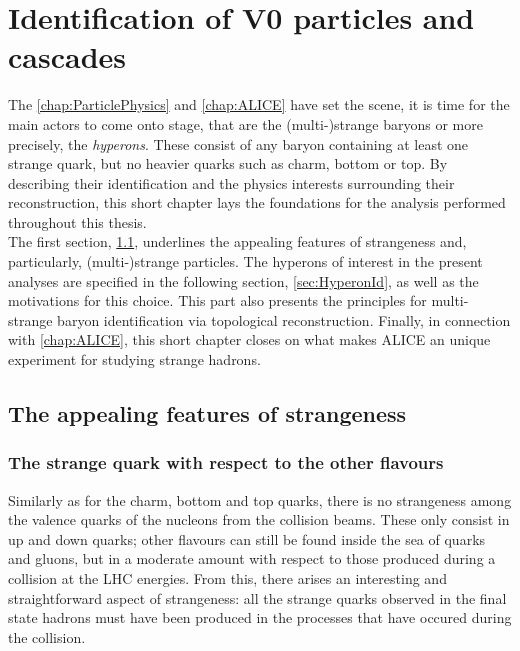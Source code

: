 \newpage
\chapter{Identification of V0 particles and cascades}
\label{chap:V0CascReconstruction}

The \chap\ref{chap:ParticlePhysics} and \ref{chap:ALICE} have set the scene, it is time for the main actors to come onto stage, that are the (multi-)strange baryons or more precisely, the \textit{hyperons}. These consist of any baryon containing at least one strange quark, but no heavier quarks such as charm, bottom or top. By describing their identification and the physics interests surrounding their reconstruction, this short chapter lays the foundations for the analysis performed throughout this thesis.\\

The first section, \Sec\ref{sec:StrangenessFeatures}, underlines the appealing features of strangeness and, particularly, (multi-)strange particles. The hyperons of interest in the present analyses are specified in the following section, \Sec\ref{sec:HyperonId}, as well as the motivations for this choice. This part also presents the principles for multi-strange baryon identification via topological reconstruction. Finally, in connection with \chap\ref{chap:ALICE}, this short chapter closes on what makes ALICE an unique experiment for studying strange hadrons.


\section{The appealing features of strangeness}
\label{sec:StrangenessFeatures}

\subsection{The strange quark with respect to the other flavours}

Similarly as for the charm, bottom and top quarks, there is no strangeness among the valence quarks of the nucleons from the collision beams. These only consist in up and down quarks; other flavours can still be found inside the sea of quarks and gluons, but in a moderate amount with respect to those produced during a collision at the LHC energies. From this, there arises an interesting and straightforward aspect of strangeness: all the strange quarks observed in the final state hadrons must have been produced in the processes that have occured during the collision.

